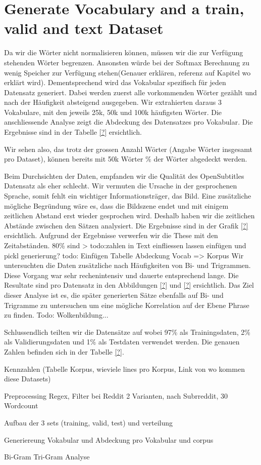 \section{Generate Vocabulary and a train, valid and text Dataset}
Da wir die Wörter nicht normalisieren können, müssen wir die zur Verfügung stehenden Wörter begrenzen. Ansonsten würde bei der Softmax Berechnung zu wenig Speicher zur Verfügung stehen(Genauer erklären, referenz auf Kapitel wo erklärt wird). Dementsprechend wird das Vokabular spezifisch für jeden Datensatz generiert.
Dabei werden zuerst alle vorkommenden Wörter gezählt und nach der Häufigkeit absteigend ausgegeben. Wir extrahierten daraus 3 Vokabulare, mit den jeweils 25k, 50k und 100k häufigsten Wörter. Die anschliessende Analyse zeigt die Abdeckung des Datensatzes pro Vokabular. Die Ergebnisse sind in der Tabelle \ref{?} ersichtlich.

Wir sehen also, das trotz der grossen Anzahl Wörter (Angabe Wörter insgesamt pro Dataset), können bereits mit 50k Wörter \% der Wörter abgedeckt werden.

Beim Durchsichten der Daten, empfanden wir die Qualität des OpenSubtitles Datensatz als eher schlecht. Wir vermuten die Ursache in der gesprochenen Sprache, somit fehlt ein wichtiger Informationsträger, das Bild. Eine zusätzliche mögliche Begründung wäre es, dass die Bildszene endet und mit einigem zeitlichen Abstand erst wieder gesprochen wird. Deshalb haben wir die zeitlichen Abstände zwischen den Sätzen analysiert. Die Ergebnisse sind in der Grafik \ref{?} ersichtlich. Aufgrund der Ergebnisse verwerfen wir die These mit den Zeitabständen. 80\% sind >
todo:zahlen in Text einfliessen lassen einfügen und pickl generierung?
todo: Einfügen Tabelle Abdeckung Vocab => Korpus
Wir untersuchten die Daten zusätzliche nach Häufigkeiten von Bi- und Trigrammen. Diese Vorgang war sehr rechenintensiv und dauerte entsprechend lange. Die Resultate sind pro Datensatz in den Abbildungen \ref{?} und \ref{?} ersichtlich. Das Ziel dieser Analyse ist es, die später generierten Sätze ebenfalls auf Bi- und Trigramme zu untersuchen um eine mögliche Korrelation auf der Ebene Phrase zu finden.
Todo: Wolkenbildung...

Schlussendlich teilten wir die Datensätze auf wobei 97\% als Trainingsdaten, 2\% als Validierungsdaten und 1\% als Testdaten verwendet werden. Die genauen Zahlen befinden sich in der Tabelle \ref{?}.

Kennzahlen
(Tabelle Korpus, wieviele lines pro Korpus, Link von wo kommen diese Datasets)

Preprocessing
Regex, Filter bei Reddit 2 Varianten, nach Subrreddit, 30 Wordcount

Aufbau der 3 sets (training, valid, test) und verteilung %

Generiereung Vokabular und Abdeckung pro Vokabular und corpus

Bi-Gram Tri-Gram Analyse
